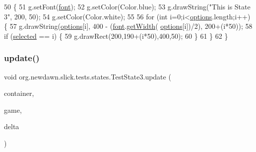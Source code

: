 \begin{DoxyCode}
50                                                                                  \{
51         g.setFont(\mbox{\hyperlink{classorg_1_1newdawn_1_1slick_1_1tests_1_1states_1_1_test_state3_a7e7969f51b4cab9b70539243e13703f0}{font}});
52         g.setColor(Color.blue);
53         g.drawString(\textcolor{stringliteral}{"This is State 3"}, 200, 50);
54         g.setColor(Color.white);
55         
56         \textcolor{keywordflow}{for} (\textcolor{keywordtype}{int} i=0;i<\mbox{\hyperlink{classorg_1_1newdawn_1_1slick_1_1tests_1_1states_1_1_test_state3_a9065e2b5ba1de5f67640ce5787582d5b}{options}}.length;i++) \{
57             g.drawString(\mbox{\hyperlink{classorg_1_1newdawn_1_1slick_1_1tests_1_1states_1_1_test_state3_a9065e2b5ba1de5f67640ce5787582d5b}{options}}[i], 400 - (\mbox{\hyperlink{classorg_1_1newdawn_1_1slick_1_1tests_1_1states_1_1_test_state3_a7e7969f51b4cab9b70539243e13703f0}{font}}.\mbox{\hyperlink{interfaceorg_1_1newdawn_1_1slick_1_1_font_a6dbdd5828730e18fcf0612307d0394b1}{getWidth}}(
      \mbox{\hyperlink{classorg_1_1newdawn_1_1slick_1_1tests_1_1states_1_1_test_state3_a9065e2b5ba1de5f67640ce5787582d5b}{options}}[i])/2), 200+(i*50));
58             \textcolor{keywordflow}{if} (\mbox{\hyperlink{classorg_1_1newdawn_1_1slick_1_1tests_1_1states_1_1_test_state3_a124621e929a74fd0ee0cb374eda7d667}{selected}} == i) \{
59                 g.drawRect(200,190+(i*50),400,50);
60             \}
61         \}
62     \}
\end{DoxyCode}
\mbox{\label{classorg_1_1newdawn_1_1slick_1_1tests_1_1states_1_1_test_state3_aa709ad4d618f9801bc5016acba14de95}} 
\subsubsection{\texorpdfstring{update()}{update()}}
{\footnotesize\ttfamily void org.\+newdawn.\+slick.\+tests.\+states.\+Test\+State3.\+update (\begin{DoxyParamCaption}\item[{\mbox{\hyperlink{classorg_1_1newdawn_1_1slick_1_1_game_container}{Game\+Container}}}]{container,  }\item[{\mbox{\hyperlink{classorg_1_1newdawn_1_1slick_1_1state_1_1_state_based_game}{State\+Based\+Game}}}]{game,  }\item[{int}]{delta }\end{DoxyParamCaption})\hspace{0.3cm}{\ttfamily [inline]}}

